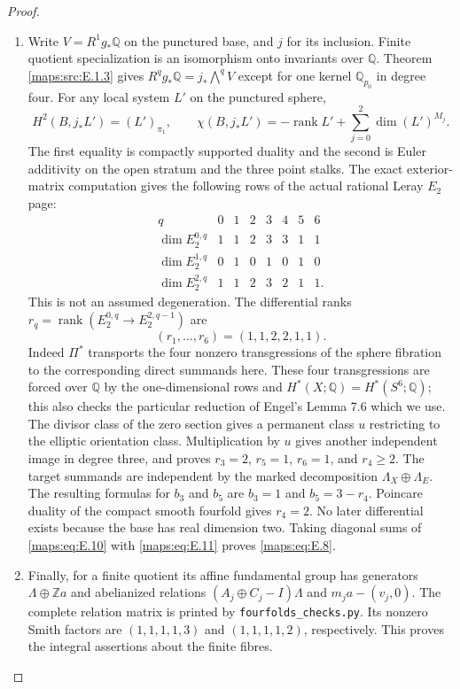 \begin{proof}
\begin{enumerate}[label=\arabic*.,leftmargin=*]
\item Write $V=R^1g_*\mathbb Q$ on the punctured base, and $j$ for its
inclusion.  Finite quotient specialization is an isomorphism onto
invariants over $\mathbb Q$.  Theorem \ref{maps:src:E.1.3} gives
$R^qg_*\mathbb Q=j_*\bigwedge^qV$ except for one kernel
$\mathbb Q_{p_0}$ in degree four.  For any local system $L'$ on
the punctured sphere,
\[
 H^2(B,j_*L')=(L')_{\pi_1},\qquad
 \chi(B,j_*L')=-\operatorname{rank}L'+
       \sum_{j=0}^2\dim (L')^{M_j}.
 \tag{E.9}\label{maps:eq:E.9}
\]
The first equality is compactly supported duality and the second is
Euler additivity on the open stratum and the three point stalks.
The exact exterior-matrix computation gives the following rows of
the actual rational Leray $E_2$ page:
\[
\begin{array}{c|rrrrrrr}
q&0&1&2&3&4&5&6\\ \hline
\dim E_2^{0,q}&1&1&2&3&3&1&1\\
\dim E_2^{1,q}&0&1&0&1&0&1&0\\
\dim E_2^{2,q}&1&1&2&3&2&1&1.
\end{array}
\tag{E.10}\label{maps:eq:E.10}
\]
This is not an assumed degeneration.  The differential ranks
$r_q=\operatorname{rank}(E_2^{0,q}\to E_2^{2,q-1})$ are
\[
 (r_1,\ldots,r_6)=(1,1,2,2,1,1).
 \tag{E.11}\label{maps:eq:E.11}
\]
Indeed $\Pi^*$ transports the four nonzero transgressions of the
sphere fibration to the corresponding direct summands here.
These four transgressions are forced over $\mathbb Q$ by the
one-dimensional rows and $H^*(X;\mathbb Q)=H^*(S^6;\mathbb Q)$;
this also checks the particular reduction of Engel's Lemma 7.6
which we use.  The divisor class of the zero section gives a
permanent class $u$ restricting to the elliptic orientation class.
Multiplication by $u$ gives another independent image in degree
three, and proves $r_3=2$, $r_5=1$, $r_6=1$, and $r_4\geq2$.
The target summands are independent by the marked decomposition
$\Lambda_X\oplus\Lambda_E$.  The resulting formulas for $b_3$
and $b_5$ are $b_3=1$ and $b_5=3-r_4$.  Poincare duality of
the compact smooth fourfold gives $r_4=2$.  No later differential
exists because the base has real dimension two.  Taking diagonal
sums of \eqref{maps:eq:E.10} with \eqref{maps:eq:E.11} proves \eqref{maps:eq:E.8}.

\item Finally, for a finite quotient its affine fundamental group has
generators $\Lambda\oplus\mathbb Z a$ and abelianized relations
$(A_j\oplus C_j-I)\Lambda$ and $m_ja-(v_j,0)$.  The complete
relation matrix is printed by \texttt{fourfolds\_checks.py}.
Its nonzero Smith factors are $(1,1,1,1,3)$ and
$(1,1,1,1,2)$, respectively.  This proves the integral assertions
about the finite fibres.
\end{enumerate}
\end{proof}


